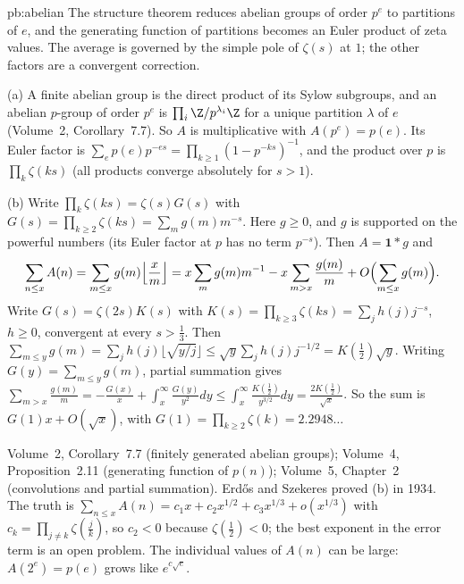 \begin{solution}{pb:abelian}
\idea The structure theorem reduces abelian groups of order $p^e$ to partitions of $e$, and the generating function of partitions
becomes an Euler product of zeta values. The average is governed by the simple pole of $\zeta(s)$ at $1$; the other factors are a
convergent correction.

\writeup (a) A finite abelian group is the direct product of its Sylow subgroups, and an abelian $p$-group of order $p^e$ is
$\prod_i\Z/p^{\lambda_i}\Z$ for a unique partition $\lambda$ of $e$ (Volume~2, Corollary~7.7). So $A$ is multiplicative with $A(p^e)=p(e)$. Its
Euler factor is $\sum_ep(e)p^{-es}=\prod_{k\ge1}(1-p^{-ks})^{-1}$, and the product over $p$ is $\prod_k\zeta(ks)$ (all products converge
absolutely for $s>1$).

(b) Write $\prod_k\zeta(ks)=\zeta(s)G(s)$ with $G(s)=\prod_{k\ge2}\zeta(ks)=\sum_mg(m)m^{-s}$. Here $g\ge0$, and $g$ is supported on the
powerful numbers (its Euler factor at $p$ has no term $p^{-s}$). Then $A=\mathbf1*g$ and
\[
\sum_{n\le x}A(n)=\sum_{m\le x}g(m)\Bigl\lfloor\frac xm\Bigr\rfloor=x\sum_mg(m)m^{-1}-x\sum_{m>x}\frac{g(m)}m+O\Bigl(\sum_{m\le x}g(m)\Bigr).
\]
Write $G(s)=\zeta(2s)K(s)$ with $K(s)=\prod_{k\ge3}\zeta(ks)=\sum_jh(j)j^{-s}$, $h\ge0$, convergent at every $s>\frac13$. Then
$\sum_{m\le y}g(m)=\sum_jh(j)\lfloor\sqrt{y/j}\rfloor\le\sqrt y\sum_jh(j)j^{-1/2}=K(\tfrac12)\sqrt y$. Writing $G(y)=\sum_{m\le y}g(m)$, partial summation gives
$\sum_{m>x}\frac{g(m)}m=-\frac{G(x)}x+\int_x^\infty\frac{G(y)}{y^2}dy\le\int_x^\infty\frac{K(\frac12)}{y^{3/2}}dy=\frac{2K(\frac12)}{\sqrt x}$. So the sum is $G(1)x+O(\sqrt x)$, with
$G(1)=\prod_{k\ge2}\zeta(k)=2.2948\ldots$

\tools Volume~2, Corollary~7.7 (finitely generated abelian groups); Volume~4, Proposition~2.11 (generating function of $p(n)$);
Volume~5, Chapter~2 (convolutions and partial summation).
\leads Erdős and Szekeres proved (b) in 1934. The truth is $\sum_{n\le x}A(n)=c_1x+c_2x^{1/2}+c_3x^{1/3}+o(x^{1/3})$ with $c_k=\prod_{j\ne k}\zeta(\frac jk)$, so
$c_2<0$ because $\zeta(\frac12)<0$; the best exponent in the error term is an open problem. The individual values of $A(n)$ can be large: $A(2^{e})=p(e)$ grows like
$e^{c\sqrt e}$.
\end{solution}

